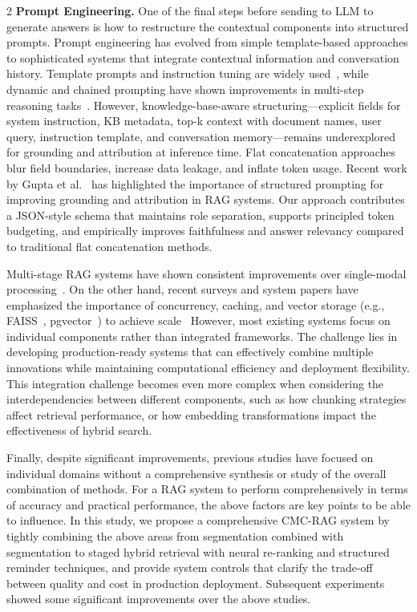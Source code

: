 \documentclass[10pt,letterpaper]{article}
\let\cite\citep
\begin{document}
\begin{multicols}{2}
\textbf{Prompt Engineering.}
One of the final steps before sending to LLM to generate answers is how to restructure the contextual components into structured prompts. Prompt engineering has evolved from simple template-based approaches to sophisticated systems that integrate contextual information and conversation history. Template prompts and instruction tuning are widely used~\cite{wei2022chain}, while dynamic and chained prompting have shown improvements in multi-step reasoning tasks~\cite{liu2023chained,wang2022selfconsistency,yao2023react}. However, knowledge-base-aware structuring—explicit fields for system instruction, KB metadata, top-k context with document names, user query, instruction template, and conversation memory—remains underexplored for grounding and attribution at inference time. Flat concatenation approaches blur field boundaries, increase data leakage, and inflate token usage. Recent work by Gupta et al.~\cite{gupta2024comprehensive} has highlighted the importance of structured prompting for improving grounding and attribution in RAG systems. Our approach contributes a JSON-style schema that maintains role separation, supports principled token budgeting, and empirically improves faithfulness and answer relevancy compared to traditional flat concatenation methods.

Multi-stage RAG systems have shown consistent improvements over single-modal processing~\cite{gao2021retrieval,lewis2020retrieval}. On the other hand, recent surveys and system papers have emphasized the importance of concurrency, caching, and vector storage (e.g., FAISS~\cite{johnson2019faiss}, pgvector~\cite{pgvector2021}) to achieve scale~\cite{zhang2024semantic,liu2024impact} However, most existing systems focus on individual components rather than integrated frameworks. The challenge lies in developing production-ready systems that can effectively combine multiple innovations while maintaining computational efficiency and deployment flexibility. This integration challenge becomes even more complex when considering the interdependencies between different components, such as how chunking strategies affect retrieval performance, or how embedding transformations impact the effectiveness of hybrid search. 

Finally, despite significant improvements, previous studies have focused on individual domains without a comprehensive synthesis or study of the overall combination of methods. For a RAG system to perform comprehensively in terms of accuracy and practical performance, the above factors are key points to be able to influence. In this study, we propose a comprehensive CMC-RAG system by tightly combining the above areas from segmentation combined with segmentation to staged hybrid retrieval with neural re-ranking and structured reminder techniques, and provide system controls that clarify the trade-off between quality and cost in production deployment. Subsequent experiments showed some significant improvements over the above studies.


\end{multicols}
\end{document}
